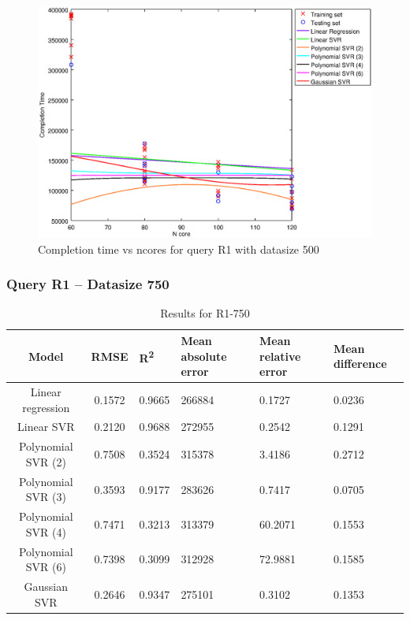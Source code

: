 \documentclass[a4paper,11pt]{article}
\begin{document}
\begin {figure}[hbtp]
\centering
\includegraphics[width=\textwidth]{output/R1_500_LINEAR_NCORE/plot_R1_500.eps}
\caption{Completion time vs ncores for query R1 with datasize 500}
\label{fig:all_linear_R1_500}
\end {figure}

\newpage
\subsubsection{Query R1 -- Datasize 750}
\begin{table}[H]
	\centering
	\begin{adjustbox}{center}
		\begin{tabular}{c | c M{1.2cm} M{2.5cm} M{2.5cm} M{1.8cm}}
			Model & RMSE & R\textsuperscript{2} & Mean absolute error & Mean relative error & Mean difference \tabularnewline
			\hline
			Linear regression & 0.1572 & 0.9665 & 266884 & 0.1727 & 0.0236 \\
			Linear SVR & 0.2120 & 0.9688 & 272955 & 0.2542 & 0.1291 \\
			Polynomial SVR (2) & 0.7508 & 0.3524 & 315378 & 3.4186 & 0.2712 \\
			Polynomial SVR (3) & 0.3593 & 0.9177 & 283626 & 0.7417 & 0.0705 \\
			Polynomial SVR (4) & 0.7471 & 0.3213 & 313379 & 60.2071 & 0.1553 \\
			Polynomial SVR (6) & 0.7398 & 0.3099 & 312928 & 72.9881 & 0.1585 \\
			Gaussian SVR & 0.2646 & 0.9347 & 275101 & 0.3102 & 0.1353 \\
		\end{tabular}
	\end{adjustbox}
	\\
	\caption{Results for R1-750}
	\label{fig:all_linear_R1_750}
\end{table}
\end{document}
